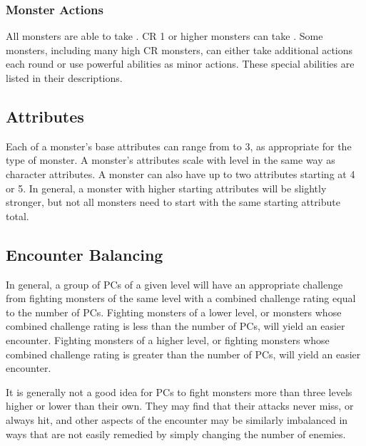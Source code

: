         \subsubsection{Monster Actions}
            All monsters are able to take .
            CR 1 or higher monsters can take .
            Some monsters, including many high CR monsters, can either take additional actions each round or use powerful abilities as minor actions.
            These special abilities are listed in their descriptions.

    \subsection{Attributes}
        Each of a monster's base attributes can range from  to 3, as appropriate for the type of monster.
        A monster's attributes scale with level in the same way as character attributes.
        A monster can also have up to two attributes starting at 4 or 5.
        In general, a monster with higher starting attributes will be slightly stronger, but not all monsters need to start with the same starting attribute total.

    \subsection{Encounter Balancing}\label{Encounter Balancing}
        In general, a group of PCs of a given level will have an appropriate challenge from fighting monsters of the same level with a combined challenge rating equal to the number of PCs.
        Fighting monsters of a lower level, or monsters whose combined challenge rating is less than the number of PCs, will yield an easier encounter.
        Fighting monsters of a higher level, or fighting monsters whose combined challenge rating is greater than the number of PCs, will yield an easier encounter.

        It is generally not a good idea for PCs to fight monsters more than three levels higher or lower than their own.
        They may find that their attacks never miss, or always hit, and other aspects of the encounter may be similarly imbalanced in ways that are not easily remedied by simply changing the number of enemies.



